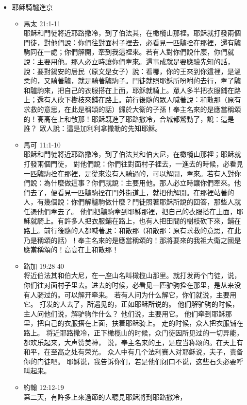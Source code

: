 \begin{itemize}
\item 耶穌騎驢進京
\begin{itemize}
\item 馬太 21:1-11\\
耶穌和門徒將近耶路撒冷，到了伯法其，在橄欖山那裡。耶穌就打發兩個門徒，對他們說：你們往對面村子裡去，必看見一匹驢拴在那裡，還有驢駒同在一處；你們解開，牽到我這裡來。若有人對你們說什麼，你們就說：主要用他。那人必立時讓你們牽來。這事成就是要應驗先知的話，說：要對錫安的居民（原文是女子）說：看哪，你的王來到你這裡，是溫柔的，又騎著驢，就是騎著驢駒子。門徒就照耶穌所吩咐的去行，牽了驢和驢駒來，把自己的衣服搭在上面，耶穌就騎上。眾人多半把衣服鋪在路上；還有人砍下樹枝來鋪在路上。前行後隨的眾人喊著說：和散那（原有求救的意思，在此是稱頌的話）歸於大衛的子孫！奉主名來的是應當稱頌的！高高在上和散那！耶穌既進了耶路撒冷，合城都驚動了，說：這是誰？
眾人說：這是加利利拿撒勒的先知耶穌。
\item 馬可 11:1-10\\
耶穌和門徒將近耶路撒冷，到了伯法其和伯大尼，在橄欖山那裡；耶穌就打發兩個門徒，
對他們說：你們往對面村子裡去，一進去的時候，必看見一匹驢駒拴在那裡，是從來沒有人騎過的，可以解開，牽來。若有人對你們說：為什麼做這事？你們就說：主要用他。那人必立時讓你們牽來。他們去了，便看見一匹驢駒拴在門外街道上，就把他解開。在那裡站著的人，有幾個說：你們解驢駒做什麼？門徒照著耶穌所說的回答，那些人就任憑他們牽去了。
他們把驢駒牽到耶穌那裡，把自己的衣服搭在上面，耶穌就騎上。有許多人把衣服鋪在路上，也有人把田間的樹枝砍下來，鋪在路上。前行後隨的人都喊著說：和散那（和散那：原有求救的意思，在此乃是稱頌的話）！奉主名來的是應當稱頌的！那將要來的我祖大衛之國是應當稱頌的！高高在上和散那！
\item 路加 19:28-40\\
将近伯法其和伯大尼，在一座山名叫橄榄山那里。就打发两个门徒，说， 你们往对面村子里去。进去的时候，必看见一匹驴驹拴在那里，是从来没有人骑过的。可以解开牵来。 若有人问为什么解它，你们就说，主要用它。 打发的人去了，所遇见的，正如耶稣所说的。 他们解驴驹的时候，主人问他们说，解驴驹作什么？ 他们说，主要用它。 他们牵到耶稣那里，把自己的衣服搭在上面，扶着耶稣骑上。 走的时候，众人把衣服铺在路上。 将近耶路撒冷，正下橄榄山的时候，众门徒因所见过的一切异能，都欢乐起来，大声赞美神， 说，奉主名来的王，是应当称颂的。在天上有和平，在至高之处有荣光。 众人中有几个法利赛人对耶稣说，夫子，责备你的门徒吧。 耶稣说，我告诉你们，若是他们闭口不说，这些石头必要呼叫起来。
\item 約翰 12:12-19\\
第二天，有許多上來過節的人聽見耶穌將到耶路撒冷，

\end{itemize}
\end{itemize}
